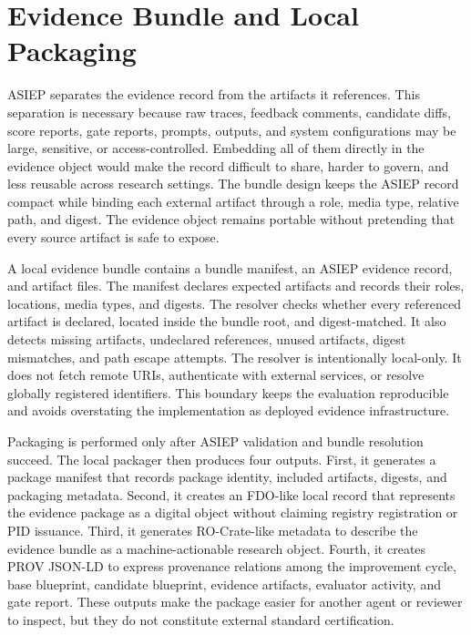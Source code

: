 \section{Evidence Bundle and Local Packaging}

ASIEP separates the evidence record from the artifacts it references. This separation is necessary because raw traces, feedback comments, candidate diffs, score reports, gate reports, prompts, outputs, and system configurations may be large, sensitive, or access-controlled. Embedding all of them directly in the evidence object would make the record difficult to share, harder to govern, and less reusable across research settings. The bundle design keeps the ASIEP record compact while binding each external artifact through a role, media type, relative path, and digest. The evidence object remains portable without pretending that every source artifact is safe to expose.

A local evidence bundle contains a bundle manifest, an ASIEP evidence record, and artifact files. The manifest declares expected artifacts and records their roles, locations, media types, and digests. The resolver checks whether every referenced artifact is declared, located inside the bundle root, and digest-matched. It also detects missing artifacts, undeclared references, unused artifacts, digest mismatches, and path escape attempts. The resolver is intentionally local-only. It does not fetch remote URIs, authenticate with external services, or resolve globally registered identifiers. This boundary keeps the evaluation reproducible and avoids overstating the implementation as deployed evidence infrastructure.

Packaging is performed only after ASIEP validation and bundle resolution succeed. The local packager then produces four outputs. First, it generates a package manifest that records package identity, included artifacts, digests, and packaging metadata. Second, it creates an FDO-like local record that represents the evidence package as a digital object without claiming registry registration or PID issuance. Third, it generates RO-Crate-like metadata to describe the evidence bundle as a machine-actionable research object. Fourth, it creates PROV JSON-LD to express provenance relations among the improvement cycle, base blueprint, candidate blueprint, evidence artifacts, evaluator activity, and gate report. These outputs make the package easier for another agent or reviewer to inspect, but they do not constitute external standard certification.

